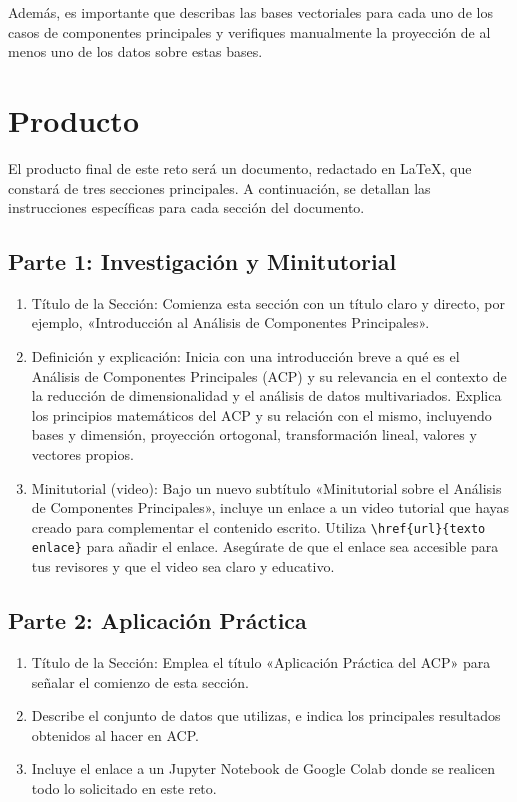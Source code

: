 \documentclass[a4,11pt]{aleph-notas}
\begin{document}
Además, es importante que describas las bases vectoriales para cada uno de los casos de componentes principales y verifiques manualmente la proyección de al menos uno de los datos sobre estas bases.

\section{Producto}

El producto final de este reto será un documento, redactado en \LaTeX, que constará de tres secciones principales. A continuación, se detallan las instrucciones específicas para cada sección del documento.


\subsection{Parte 1: Investigación y Minitutorial}

\begin{enumerate}
\item
    Título de la Sección: Comienza esta sección con un título claro y directo, por ejemplo, «Introducción al Análisis de Componentes Principales».
\item
    Definición y explicación: Inicia con una introducción breve a qué es el Análisis de Componentes Principales (ACP) y su relevancia en el contexto de la reducción de dimensionalidad y el análisis de datos multivariados. Explica los principios matemáticos del ACP y su relación con el mismo, incluyendo bases y dimensión, proyección ortogonal, transformación lineal, valores y vectores propios.
\item
    Minitutorial (video): Bajo un nuevo subtítulo «Minitutorial sobre el Análisis de Componentes Principales», incluye un enlace a un video tutorial que hayas creado para complementar el contenido escrito. Utiliza \verb+\href{url}{texto enlace}+ para añadir el enlace. Asegúrate de que el enlace sea accesible para tus revisores y que el video sea claro y educativo.
\end{enumerate}

\subsection{Parte 2: Aplicación Práctica}

\begin{enumerate}
\item
    Título de la Sección: Emplea el título «Aplicación Práctica del ACP» para señalar el comienzo de esta sección.
\item
    Describe el conjunto de datos que utilizas, e indica los principales resultados obtenidos al hacer en ACP.
\item 
    Incluye el enlace a un Jupyter Notebook de Google Colab donde se realicen todo lo solicitado en este reto.
\end{enumerate}
\end{document}
